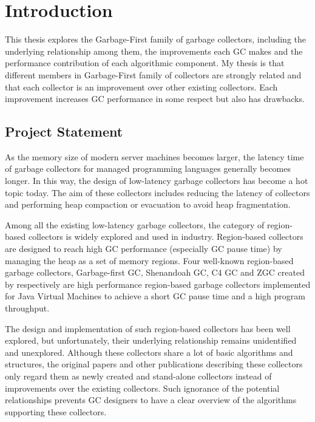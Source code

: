 \chapter{Introduction}
\label{cha:intro}

This thesis explores the Garbage-First family of garbage collectors, including
the underlying relationship among them, the improvements each GC makes and the performance
contribution of each algorithmic component.
My thesis is that different members in Garbage-First family of collectors are strongly related
and that each collector is an improvement over other existing collectors.
Each improvement increases GC performance in some respect but also has drawbacks.

\section{Project Statement}

As the memory size of modern server machines becomes larger, the latency time of
garbage collectors for managed programming languages generally becomes longer.
In this way, the design of low-latency garbage collectors has become
a hot topic today. The aim of these collectors includes reducing the latency of collectors and
performing heap compaction or evacuation to avoid heap fragmentation.

Among all the existing low-latency garbage collectors, the category of region-based
collectors is widely explored and used in industry.
Region-based collectors are designed to reach high GC
performance (especially GC pause time) by managing the heap as a set of memory regions.
Four well-known region-based garbage collectors,
Garbage-first GC, Shenandoah GC, C4 GC and ZGC created by
\citep{detlefs2004garbage,flood2016shenandoah,tene2011c4,liden_karlsson_2018} respectively
are high performance region-based garbage collectors implemented for Java Virtual Machines
to achieve a short GC pause time and a high program throughput.

The design and implementation of such region-based collectors has been well
explored, but unfortunately, their underlying relationship remains unidentified and unexplored.
Although these collectors share a lot of basic algorithms and structures,
the original papers and other publications describing these collectors only regard them as
newly created and stand-alone collectors instead of improvements over the existing collectors.
Such ignorance of the potential relationships prevents GC designers to have a clear
overview of the algorithms supporting these collectors.

